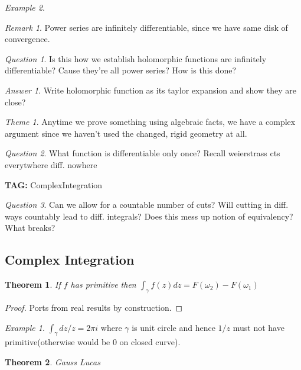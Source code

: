 \documentclass[11pt]{article}
\newtheorem{theorem}{Theorem}
\theoremstyle{remark}
\newtheorem{remark}{Remark}
\newtheorem{quest}{Question}
\newtheorem{ans}{Answer}
\newtheorem{theme}{Theme}
\newtheorem{example}{Example}
\begin{document}
\begin{example}
\begin{remark}
	Power series are infinitely differentiable, since we have same disk of convergence. 
\end{remark}

\begin{quest}
	Is this how we establish holomorphic functions are infinitely differentiable? Cause they're all power series? How is this done?
\end{quest}

\begin{ans}
	Write holomorphic function as its taylor expansion and show they are close?
\end{ans}

\begin{theme}
	Anytime we prove something using algebraic facts, we have a complex argument since we haven't used the changed, rigid geometry at all.
\end{theme}

\begin{quest}
	What function is differentiable only once? Recall weierstrass cts everytwhere diff. nowhere
\end{quest}

\textbf{TAG:} ComplexIntegration

\begin{quest}
	Can we allow for a countable number of cuts? Will cutting in diff. ways countably lead to diff. integrals? Does this mess up notion of equivalency? What breaks? 
\end{quest}

\subsection{Complex Integration}

\begin{theorem}
	If $f$ has primitive then $\int_{\gamma} f(z)dz = F(\omega_2) - F(\omega_1)$
\end{theorem}

\begin{proof}
	Ports from real results by construction.
\end{proof}

\begin{example}
	$\int_{\gamma} dz/z=2\pi i$ where $\gamma$ is unit circle and hence $1/z$ must not have primitive(otherwise would be 0 on closed curve).
\end{example}

\begin{theorem}
	Gauss Lucas
\end{theorem}


\end{example}
\end{document}
